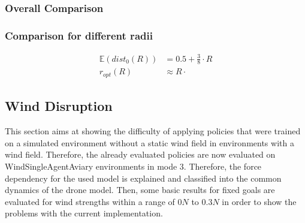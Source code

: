 \newpage

\subsubsection{Overall Comparison}

\newpage

\subsubsection{Comparison for different radii}
\begin{align}
	\mathbb{E} (dist_0(R)) &= 0.5 + \frac{3}{8} \cdot R \\
	r_{opt}(R) &\approx R \cdot  
\end{align}

\newpage

\subsection{Wind Disruption}
This section aims at showing the difficulty of applying policies that 
were trained on a simulated environment without a static wind field
in environments with a wind field. Therefore, the already evaluated
policies are now evaluated on WindSingleAgentAviary environments in mode 3.
Therefore, the force dependency for the used model is explained and
classified into the common dynamics of the drone model.
Then, some basic results for fixed goals are evaluated for wind strengths
within a range of $0N$ to $0.3N$ in order to show the problems with the current implementation.

